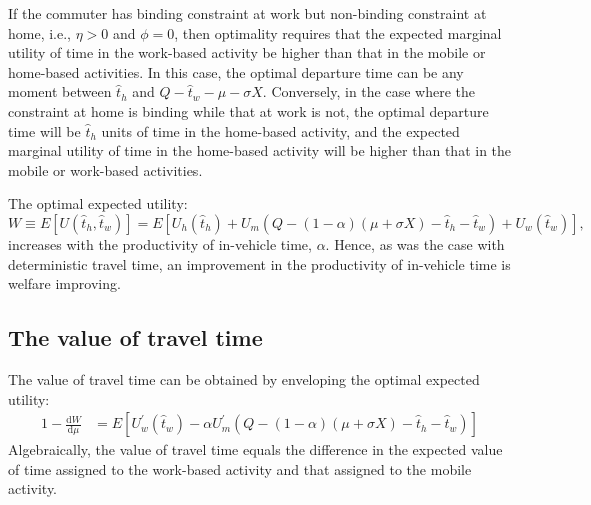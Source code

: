 \documentclass[12pt,a4paper,british]{article}
\begin{document}
If the commuter has binding constraint at work but non-binding constraint at home, i.e., $\eta>0$ and $\phi=0$, then optimality requires that the expected marginal utility of time in the work-based activity be higher than that in the mobile or home-based activities. In this case, the optimal departure time can be any moment between $\hat{t}_{h}$ and $Q-\hat{t}_{w}-\mu-\sigma X$. Conversely, in the case where the constraint at home is binding while that at work is not, the optimal departure time will be $\hat{t}_{h}$ units of time in the home-based activity, and the expected marginal utility of time in the home-based activity will be higher than that in the mobile or work-based activities.

The optimal expected utility: 
\begin{equation*}
W\equiv E\left[U\left(\hat{t}_{h},\hat{t}_{w}\right)\right]=E\left[U_{h}\left(\hat{t}_{h}\right)+U_{m}\left(Q-\left(1-\alpha\right)\left(\mu+\sigma X\right)-\hat{t}_{h}-\hat{t}_{w}\right)+U_{w}\left(\hat{t}_{w}\right)\right],
\end{equation*}
increases with the productivity of in-vehicle time, $\alpha$. Hence, as was the case with deterministic travel time, an improvement in the productivity of in-vehicle time is welfare improving.



\subsection*{The value of travel time}

The value of travel time can be obtained by enveloping the optimal expected utility:
\begin{alignat*}{1}
-\frac{\mathrm{d}W}{\mathrm{d}\mu} & = E\left[ U_{w}^{\prime}\left( \hat{t}_{w} \right) - \alpha U_{m}^{\prime}\left( Q - \left(1 - \alpha \right) \left( \mu + \sigma X \right) - \hat{t}_{h} - \hat{t}_{w} \right)\right]
\end{alignat*}
Algebraically, the value of travel time equals the difference in the expected value of time assigned to the work-based activity and that assigned to the mobile activity. 
\end{document}
